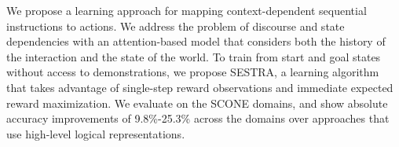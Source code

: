 We propose a learning approach for mapping context-dependent sequential instructions to actions. We address the problem of discourse and state dependencies with an attention-based model that considers both the history of the interaction and the state of the world. To train from start and goal states without access to demonstrations, we propose SESTRA, a learning algorithm that takes advantage of single-step reward observations and immediate expected reward maximization. We evaluate on the SCONE domains, and show absolute accuracy improvements of 9.8\%-25.3\% across the domains over approaches that use high-level logical representations.
